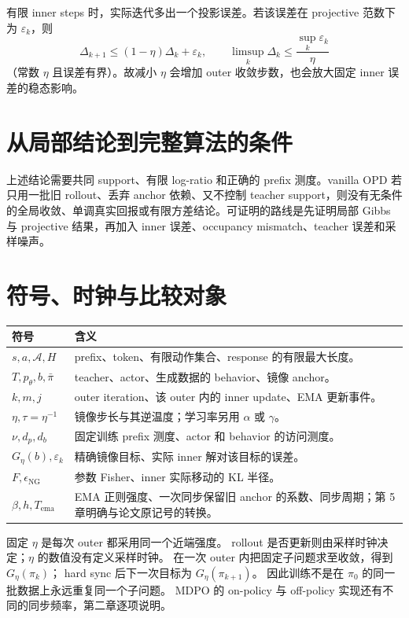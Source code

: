 有限 inner steps 时，实际迭代多出一个投影误差。若该误差在 projective 范数下为 $\varepsilon_k$，则
\[
 \Delta_{k+1}\le (1-\eta)\Delta_k+\varepsilon_k,
 \qquad
 \limsup_k\Delta_k\le \frac{\sup_k\varepsilon_k}{\eta}
\]
（常数 $\eta$ 且误差有界）。故减小 $\eta$ 会增加 outer 收敛步数，也会放大固定 inner 误差的稳态影响。

\section{从局部结论到完整算法的条件}

上述结论需要共同 support、有限 log-ratio 和正确的 prefix 测度。vanilla OPD 若只用一批旧 rollout、丢弃 anchor 依赖、又不控制 teacher support，则没有无条件的全局收敛、单调真实回报或有限方差结论。可证明的路线是先证明局部 Gibbs 与 projective 结果，再加入 inner 误差、occupancy mismatch、teacher 误差和采样噪声。

\section{符号、时钟与比较对象}
\begin{table}[htbp]
\centering
\begin{tabular}{p{}p{}}
\toprule 符号 & 含义\\\midrule
$s,a,\mathcal A,H$ & prefix、token、有限动作集合、response 的有限最大长度。\\
$T,p_\theta,b,\bar\pi$ & teacher、actor、生成数据的 behavior、镜像 anchor。\\
$k,m,j$ & outer iteration、该 outer 内的 inner update、EMA 更新事件。\\
$\eta,\tau=\eta^{-1}$ & 镜像步长与其逆温度；学习率另用 $\alpha$ 或 $\gamma$。\\
$\nu,d_p,d_b$ & 固定训练 prefix 测度、actor 和 behavior 的访问测度。\\
$G_\eta(b),\varepsilon_k$ & 精确镜像目标、实际 inner 解对该目标的误差。\\
$F,\epsilon_{\mathrm{NG}}$ & 参数 Fisher、inner 实际移动的 KL 半径。\\
$\beta,h,T_{\mathrm{ema}}$ & EMA 正则强度、一次同步保留旧 anchor 的系数、同步周期；第 5 章明确与论文原记号的转换。\\
\bottomrule
\end{tabular}
\end{table}

固定 $\eta$ 是每次 outer 都采用同一个近端强度。
rollout 是否更新则由采样时钟决定；$\eta$ 的数值没有定义采样时钟。
在一次 outer 内把固定子问题求至收敛，得到 $G_\eta(\pi_k)$；
hard sync 后下一次目标为 $G_\eta(\pi_{k+1})$。
因此训练不是在 $\pi_0$ 的同一批数据上永远重复同一个子问题。
MDPO 的 on-policy 与 off-policy 实现还有不同的同步频率，第二章逐项说明。


